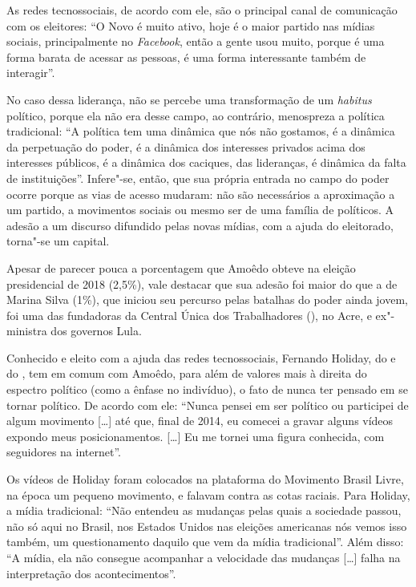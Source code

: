 As redes tecnossociais, de acordo com ele, são o principal canal de
comunicação com os eleitores: ``O Novo é muito ativo, hoje é o maior
partido nas mídias sociais, principalmente no \emph{Facebook}, então a
gente usou muito, porque é uma forma barata de acessar as pessoas, é uma
forma interessante também de interagir''.

No caso dessa liderança, não se percebe uma transformação de um
\emph{habitus} político, porque ela não era desse campo, ao contrário,
menospreza a política tradicional: ``A política tem uma dinâmica que nós
não gostamos, é a dinâmica da perpetuação do poder, é a dinâmica dos
interesses privados acima dos interesses públicos, é a dinâmica dos
caciques, das lideranças, é dinâmica da falta de instituições''.
Infere"-se, então, que sua própria entrada no campo do poder ocorre
porque as vias de acesso mudaram: não são necessários a aproximação a um
partido, a movimentos sociais ou mesmo ser de uma família de políticos.
A adesão a um discurso difundido pelas novas mídias, com a ajuda do
eleitorado, torna"-se um capital.

Apesar de parecer pouca a porcentagem que Amoêdo obteve na eleição
presidencial de 2018 (2,5\%), vale destacar que sua adesão foi maior do
que a de Marina Silva (1\%), que iniciou seu percurso pelas batalhas do
poder ainda jovem, foi uma das fundadoras da Central Única dos
Trabalhadores (), no Acre, e ex"-ministra dos governos Lula.

Conhecido e eleito com a ajuda das redes tecnossociais, Fernando
Holiday, do  e do , tem em comum com Amoêdo, para além de valores
mais à direita do espectro político (como a ênfase no indivíduo), o fato
de nunca ter pensado em se tornar político. De acordo com ele: ``Nunca
pensei em ser político ou participei de algum movimento {[}\ldots{}{]} até
que, final de 2014, eu comecei a gravar alguns vídeos expondo meus
posicionamentos. {[}\ldots{}{]} Eu me tornei uma figura conhecida, com
seguidores na internet''.

Os vídeos de Holiday foram colocados na plataforma do Movimento Brasil
Livre, na época um pequeno movimento, e falavam contra as cotas raciais.
Para Holiday, a mídia tradicional: ``Não entendeu as mudanças pelas
quais a sociedade passou, não só aqui no Brasil, nos Estados Unidos nas
eleições americanas nós vemos isso também, um questionamento daquilo que
vem da mídia tradicional''. Além disso: ``A mídia, ela não consegue
acompanhar a velocidade das mudanças {[}\ldots{}{]} falha na interpretação
dos acontecimentos''.


